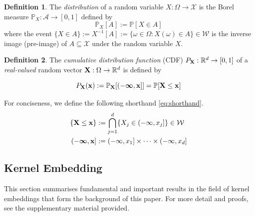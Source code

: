 \documentclass[twoside]{article} \usepackage{aistats2017}
\theoremstyle{definition}
\newtheorem{definition}{Definition}[section]
\theoremstyle{theorem}
\newcommand{\rv}[1]{{#1}}
\begin{document}
	\begin{definition} \label{def:distribution}
		\citep{bauer1981probability}
		The \textit{distribution} of a random variable $\rv{X} : \Omega \to \mathcal{X}$ is the Borel measure $\mathbb{P}_{\rv{X}} : \mathcal{A} \to [0, 1]$ defined by
		\begin{equation}
			\mathbb{P}_{\rv{X}}[A] := \mathbb{P}[\rv{X} \in A]
		\label{eq:distribution}
		\end{equation}
		where the event $\{\rv{X} \in A\} := \rv{X}^{-1}[A] := \{\omega \in \Omega : \rv{X}(\omega) \in A\} \in \mathcal{W}$ is the inverse image (pre-image) of $A \subseteq \mathcal{X}$ under the random variable $\rv{X}$.
	\end{definition}
	
	\begin{definition} \label{def:cdf}
		\citep{bauer1981probability}
		The \textit{cumulative distribution function} (CDF) $P_{\bvec{\rv{X}}} : \mathbb{R}^{d} \to [0, 1]$ of a \textit{real-valued} random vector $\bvec{\rv{X}} : \Omega \to \mathbb{R}^{d}$ is defined by
		
		\begin{equation}
				P_{\bvec{\rv{X}}}(\bvec{x}) := \mathbb{P}_{\bvec{\rv{X}}}[(-\bm{\infty}, \bvec{x}]] = \mathbb{P}[\bvec{\rv{X}} \leq \bvec{x}]
		\label{eq:cdf}
		\end{equation}

		For conciseness, we define the following shorthand \eqref{eq:shorthand}. 
		\begin{equation}
			\begin{aligned}
				\{\bvec{\rv{X}} \leq \bvec{x}\} &:= \bigcap\limits_{j = 1}^{d} \{\rv{X}_{j} \in (-\infty, x_{j}]\} \in \mathcal{W} \\
				(-\bm{\infty}, \bvec{x}] &:= (-\infty, x_{1}] \times \dots \times (-\infty, x_{d}] \\
			\end{aligned}
		\label{eq:shorthand}
		\end{equation}
	\end{definition}
		
	\subsection{Kernel Embedding}
	\label{sec:background:kernel_embedding}
	
		This section summarises fundamental and important results in the field of kernel embeddings that form the background of this paper. For more detail and proofs, see the supplementary material provided.
\end{document}
